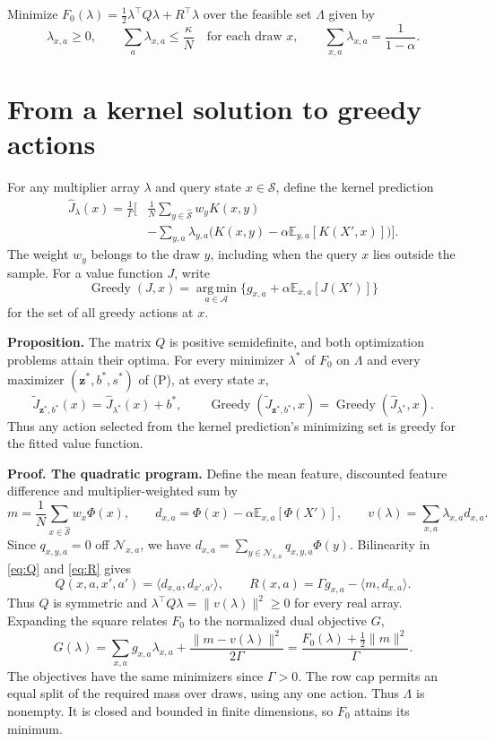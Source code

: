 \documentclass[12pt,a4paper]{article}
\newcommand{\ip}[2]{\langle #1,#2\rangle}
\newcommand{\norm}[1]{\lVert #1\rVert}
\newcommand{\E}{\mathbb E}
\newcommand{\N}{\mathcal N}
\newcommand{\Jhat}{\widehat J}
\newcommand{\lead}[1]{\par\smallskip\noindent\textbf{#1}\enspace}
\begin{document}
Minimize \(F_0(\lambda)=\tfrac12\lambda^\top Q\lambda+R^\top\lambda\)
over the feasible set \(\Lambda\) given by
\[
 \lambda_{x,a}\ge0,\qquad \sum_a\lambda_{x,a}\le\frac{\kappa}{N}
   \quad\text{for each draw }x,\qquad
 \sum_{x,a}\lambda_{x,a}=\frac1{1-\alpha}.
 \tag{D}
\]
\newpage
\section*{From a kernel solution to greedy actions}
For any multiplier array \(\lambda\) and query state \(x\in\mathcal S\),
define the kernel prediction
\begin{equation}
\begin{aligned}
 \Jhat_\lambda(x)=\frac1\Gamma\biggl[
 &\frac1N\sum_{y\in\widehat{\mathcal S}} w_y K(x,y)\\[-2pt]
 &-\sum_{y,a}\lambda_{y,a}
  \bigl(K(x,y)-\alpha\E_{y,a}[K(X',x)]\bigr)\biggr].
\end{aligned}
\label{eq:kernel}
\end{equation}
The weight \(w_y\) belongs to the draw \(y\), including when the query
\(x\) lies outside the sample. For a value function \(J\), write
\[
 \operatorname{Greedy}(J,x)=\operatorname*{arg\,min}_{a\in\mathcal A}
      \{g_{x,a}+\alpha\E_{x,a}[J(X')]\}
\]
for the set of all greedy actions at \(x\).

\textbf{Proposition.} The matrix \(Q\) is positive semidefinite, and both
optimization problems attain their optima. For every minimizer
\(\lambda^*\) of \(F_0\) on \(\Lambda\) and every maximizer
\((\mathbf z^*,b^*,s^*)\) of (P), at every state \(x\),
\begin{equation}
 \widetilde J_{\mathbf z^*,b^*}(x)=\Jhat_{\lambda^*}(x)+b^*,
 \qquad
 \operatorname{Greedy}(\widetilde J_{\mathbf z^*,b^*},x)
    =\operatorname{Greedy}(\Jhat_{\lambda^*},x).
 \label{eq:claim}
\end{equation}
Thus any action selected from the kernel prediction's minimizing set
is greedy for the fitted value function.

\lead{Proof. The quadratic program.} Define the mean feature, discounted
feature difference and multiplier-weighted sum by
\[
 m=\frac1N\sum_{x\in\widehat{\mathcal S}}w_x\Phi(x),\qquad
 d_{x,a}=\Phi(x)-\alpha\E_{x,a}[\Phi(X')],\qquad
 v(\lambda)=\sum_{x,a}\lambda_{x,a}d_{x,a}.
\]
Since \(q_{x,y,a}=0\) off \(\N_{x,a}\), we have
\(d_{x,a}=\sum_{y\in\N_{x,a}}q_{x,y,a}\Phi(y)\).
Bilinearity in \eqref{eq:Q} and \eqref{eq:R} gives
\[
 Q(x,a,x',a')=\ip{d_{x,a}}{d_{x',a'}},\qquad
 R(x,a)=\Gamma g_{x,a}-\ip{m}{d_{x,a}}.
\]
Thus \(Q\) is symmetric and
\(\lambda^\top Q\lambda=\norm{v(\lambda)}^2\ge0\) for every real array.
Expanding the square relates \(F_0\) to the normalized dual objective \(G\),
\begin{equation}
 G(\lambda)=\sum_{x,a}g_{x,a}\lambda_{x,a}+
 \frac{\norm{m-v(\lambda)}^2}{2\Gamma}
 =\frac{F_0(\lambda)+\tfrac12\norm{m}^2}{\Gamma}.
 \label{eq:normal}
\end{equation}
The objectives have the same minimizers since \(\Gamma>0\).
The row cap permits an equal split of the required mass over draws,
using any one action. Thus \(\Lambda\) is nonempty. It is closed and bounded
in finite dimensions, so \(F_0\) attains its minimum.
\end{document}
